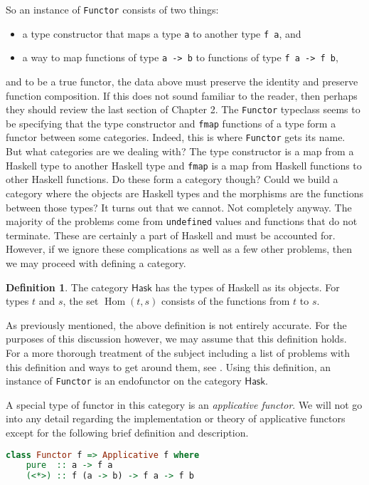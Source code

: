 \documentclass[MS, xcolor=dvipsnames]{wfuthesis}
\def\Hask{\mathsf{Hask}}
\DeclareMathOperator{\Hom}{Hom}
\theoremstyle{definition}
\newtheorem{definition}[theorem]{Definition}
\begin{document}
So an instance of \lstinline{Functor} consists of two things: 
\begin{itemize}
  \item a type constructor that maps a type \lstinline{a} to another type \lstinline{f a}, and
  \item a way to map functions of type \lstinline{a -> b} to functions of type \lstinline{f a -> f b},
\end{itemize}
and to be a true functor, the data above must preserve the identity and preserve function composition. If this does not sound familiar to the reader, then perhaps they should review the last section of Chapter 2. The \lstinline{Functor} typeclass seems to be specifying that the type constructor and \lstinline{fmap} functions of a type form a functor between some categories. Indeed, this is where \lstinline{Functor} gets its name. But what categories are we dealing with? The type constructor is a map from a Haskell type to another Haskell type and \lstinline{fmap} is a map from Haskell functions to other Haskell functions. Do these form a category though? Could we build a category where the objects are Haskell types and the morphisms are the functions between those types? It turns out that we cannot. Not completely anyway. The majority of the problems come from \lstinline{undefined} values and functions that do not terminate. These are certainly a part of Haskell and must be accounted for. However, if we ignore these complications as well as a few other problems, then we may proceed with defining a category. 
\begin{definition}
  The category $\Hask$ has the types of Haskell as its objects. For types $t$ and $s$, the set $\Hom(t,s)$ consists of the functions from $t$ to $s$. 
\end{definition}
As previously mentioned, the above definition is not entirely accurate. For the purposes of this discussion however, we may assume that this definition holds. For a more thorough treatment of the subject including a list of problems with this definition and ways to get around them, see \cite{Milewski2019}. Using this definition, an instance of \lstinline{Functor} is an endofunctor on the category $\Hask$. \par 
A special type of functor in this category is an \emph{applicative functor}. We will not go into any detail regarding the implementation or theory of applicative functors except for the following brief definition and description.
\begin{lstlisting}[language=Haskell]
class Functor f => Applicative f where
    pure  :: a -> f a
    (<*>) :: f (a -> b) -> f a -> f b
\end{lstlisting}
\end{document}
